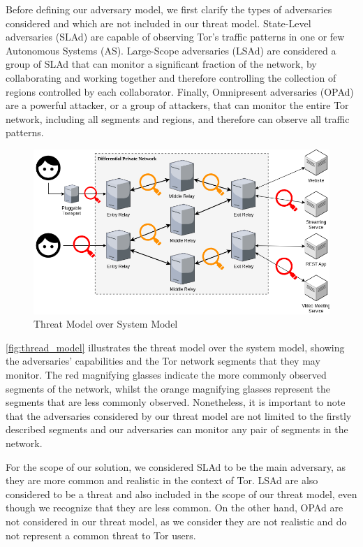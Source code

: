 Before defining our adversary model, we first clarify the types of adversaries considered and which are not included in our threat model. State-Level adversaries (SLAd) are capable of observing Tor's traffic patterns in one or few Autonomous Systems (AS). Large-Scope adversaries (LSAd) are considered a group of SLAd that can monitor a significant fraction of the network, by collaborating and working together and therefore controlling the collection of regions controlled by each collaborator. Finally, Omnipresent adversaries (OPAd) are a powerful attacker, or a group of attackers, that can monitor the entire Tor network, including all segments and regions, and therefore can observe all traffic patterns.

\begin{figure}[!h]
  \centering
  \includegraphics[width=\textwidth]{Chapters/Figures/Threat_Model.png}
  \caption{Threat Model over System Model}\label{fig:thread_model}
\end{figure}

\autoref{fig:thread_model} illustrates the threat model over the system model, showing the adversaries' capabilities and the Tor network segments that they may monitor. The red magnifying glasses indicate the more commonly observed segments of the network, whilst the orange magnifying glasses represent the segments that are less commonly observed. Nonetheless, it is important to note that the adversaries considered by our threat model are not limited to the firstly described segments and our adversaries can monitor any pair of segments in the network.  

For the scope of our solution, we considered SLAd to be the main adversary, as they are more common and realistic in the context of Tor. LSAd are also considered to be a threat and also included in the scope of our threat model, even though we recognize that they are less common. On the other hand, OPAd are not considered in our threat model, as we consider they are not realistic and do not represent a common threat to Tor users.


